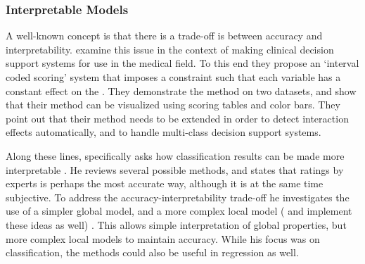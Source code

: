 \subsubsection{Interpretable Models}
    A well-known concept is that there is a trade-off  is between accuracy and interpretability. \citet{Van_Belle2012-dt} examine this issue in the context of making clinical decision support systems for use in the medical field. To this end they propose an `interval coded scoring' system that imposes a constraint such that each variable has a constant effect on the .  They demonstrate the method on two datasets, and show that their method can be visualized using scoring tables and color bars. They point out that their method needs to be extended in order to detect interaction effects automatically, and to handle multi-class decision support systems. 

  Along these lines,  \citet{Ruping2006-xj} specifically asks how classification results can be made more interpretable . He reviews several possible methods, and states that ratings by experts is perhaps the most accurate way, although it is at the same time subjective. To address the accuracy-interpretability trade-off he investigates the use of a simpler global model, and a more complex local model (\citet{Otte2013-oo} and \citet{Ribeiro2016-uc} implement these ideas as well) . This allows simple interpretation of global properties, but more complex local models to maintain accuracy. While his focus was on classification, the methods could also be useful in regression as well. 

